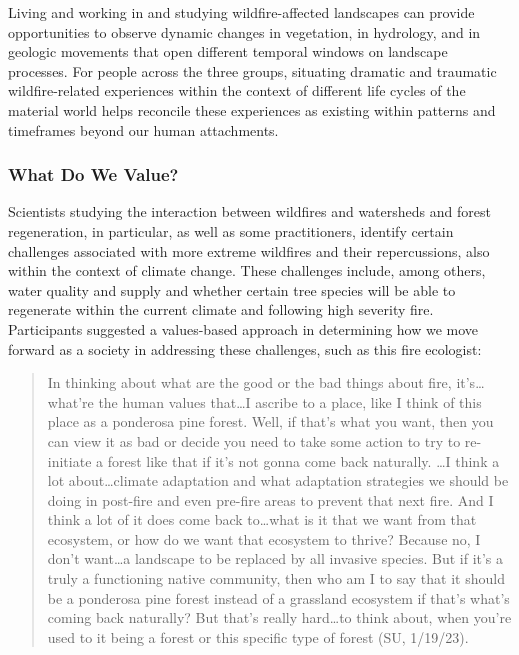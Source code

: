\documentclass[
]{article}
\begin{document}
Living and working in and studying wildfire-affected landscapes can provide opportunities to observe dynamic changes in vegetation, in hydrology, and in geologic movements that open different temporal windows on landscape processes. For people across the three groups, situating dramatic and traumatic wildfire-related experiences within the context of different life cycles of the material world helps reconcile these experiences as existing within patterns and timeframes beyond our human attachments.

\subsubsection{What Do We Value?}\label{what-do-we-value}

Scientists studying the interaction between wildfires and watersheds and forest regeneration, in particular, as well as some practitioners, identify certain challenges associated with more extreme wildfires and their repercussions, also within the context of climate change. These challenges include, among others, water quality and supply and whether certain tree species will be able to regenerate within the current climate and following high severity fire. Participants suggested a values-based approach in determining how we move forward as a society in addressing these challenges, such as this fire ecologist:

\begin{quote}
In thinking about what are the good or the bad things about fire, it's\ldots what're the human values that\ldots I ascribe to a place, like I think of this place as a ponderosa pine forest. Well, if that's what you want, then you can view it as bad or decide you need to take some action to try to re-initiate a forest like that if it's not gonna come back naturally. \ldots I think a lot about\ldots climate adaptation and what adaptation strategies we should be doing in post-fire and even pre-fire areas to prevent that next fire. And I think a lot of it does come back to\ldots what is it that we want from that ecosystem, or how do we want that ecosystem to thrive? Because no, I don't want\ldots a landscape to be replaced by all invasive species. But if it's a truly a functioning native community, then who am I to say that it should be a ponderosa pine forest instead of a grassland ecosystem if that's what's coming back naturally? But that's really hard\ldots to think about, when you're used to it being a forest or this specific type of forest (SU, 1/19/23).
\end{quote}
\end{document}
